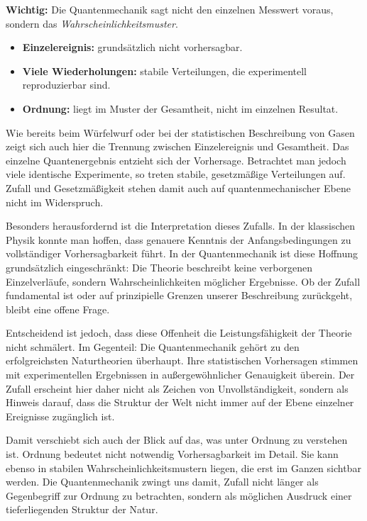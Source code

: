 \begin{DidacticBox}
	\label{box:vorhersagt}
	\small
	\textbf{Wichtig:} Die Quantenmechanik sagt nicht den einzelnen Messwert voraus,
	sondern das \emph{Wahrscheinlichkeitsmuster}.
	\begin{itemize}
		\item \textbf{Einzelereignis:} grundsätzlich nicht vorhersagbar.
		\item \textbf{Viele Wiederholungen:} stabile Verteilungen, die experimentell reproduzierbar sind.
		\item \textbf{Ordnung:} liegt im Muster der Gesamtheit, nicht im einzelnen Resultat.
	\end{itemize}
\end{DidacticBox}

Wie bereits beim Würfelwurf
oder bei der statistischen Beschreibung von Gasen
zeigt sich auch hier die Trennung
zwischen Einzelereignis und Gesamtheit.
Das einzelne Quantenergebnis entzieht sich der Vorhersage.
Betrachtet man jedoch viele identische Experimente,
so treten stabile, gesetzmäßige Verteilungen auf.
Zufall und Gesetzmäßigkeit
stehen damit auch auf quantenmechanischer Ebene
nicht im Widerspruch.

Besonders herausfordernd
ist die Interpretation dieses Zufalls.
In der klassischen Physik konnte man hoffen,
dass genauere Kenntnis der Anfangsbedingungen
zu vollständiger Vorhersagbarkeit führt.
In der Quantenmechanik ist diese Hoffnung grundsätzlich eingeschränkt:
Die Theorie beschreibt keine \glqq verborgenen Einzelverläufe\grqq{},
sondern Wahrscheinlichkeiten möglicher Ergebnisse.
Ob der Zufall fundamental ist
oder auf prinzipielle Grenzen unserer Beschreibung zurückgeht,
bleibt eine offene Frage.

Entscheidend ist jedoch,
dass diese Offenheit
die Leistungsfähigkeit der Theorie nicht schmälert.
Im Gegenteil:
Die Quantenmechanik gehört zu den erfolgreichsten Naturtheorien überhaupt.
Ihre statistischen Vorhersagen
stimmen mit experimentellen Ergebnissen
in außergewöhnlicher Genauigkeit überein.
Der Zufall erscheint hier daher nicht als Zeichen von Unvollständigkeit,
sondern als Hinweis darauf,
dass die Struktur der Welt
nicht immer auf der Ebene einzelner Ereignisse zugänglich ist.

Damit verschiebt sich auch der Blick auf das,
was unter Ordnung zu verstehen ist.
Ordnung bedeutet nicht notwendig
Vorhersagbarkeit im Detail.
Sie kann ebenso in stabilen Wahrscheinlichkeitsmustern liegen,
die erst im Ganzen sichtbar werden.
Die Quantenmechanik zwingt uns damit,
Zufall nicht länger als Gegenbegriff zur Ordnung zu betrachten,
sondern als möglichen Ausdruck
einer tieferliegenden Struktur der Natur.

